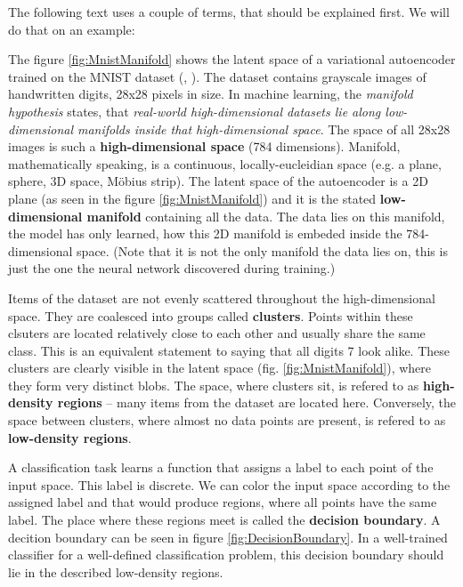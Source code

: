 \qquad

The following text uses a couple of terms, that should be explained first. We will do that on an example:

The figure \ref{fig:MnistManifold} shows the latent space of a variational autoencoder trained on the MNIST dataset (\cite{VariationalAutoencoder}, \cite{Mnist}). The dataset contains grayscale images of handwritten digits, 28x28 pixels in size. In machine learning, the \emph{manifold hypothesis} states, that \emph{real-world high-dimensional datasets lie along low-dimensional manifolds inside that high-dimensional space}. The space of all 28x28 images is such a \textbf{high-dimensional space} (784 dimensions). Manifold, mathematically speaking, is a continuous, locally-eucleidian space (e.g. a plane, sphere, 3D space, Möbius strip). The latent space of the autoencoder is a 2D plane (as seen in the figure \ref{fig:MnistManifold}) and it is the stated \textbf{low-dimensional manifold} containing all the data. The data lies on this manifold, the model has only learned, how this 2D manifold is embeded inside the 784-dimensional space. (Note that it is not the only manifold the data lies on, this is just the one the neural network discovered during training.)

Items of the dataset are not evenly scattered throughout the high-dimensional space. They are coalesced into groups called \textbf{clusters}. Points within these clsuters are located relatively close to each other and usually share the same class. This is an equivalent statement to saying that all digits 7 look alike. These clusters are clearly visible in the latent space (fig. \ref{fig:MnistManifold}), where they form very distinct blobs. The space, where clusters sit, is refered to as \textbf{high-density regions} -- many items from the dataset are located here. Conversely, the space between clusters, where almost no data points are present, is refered to as \textbf{low-density regions}.

A classification task learns a function that assigns a label to each point of the input space. This label is discrete. We can color the input space according to the assigned label and that would produce regions, where all points have the same label. The place where these regions meet is called the \textbf{decision boundary}. A decition boundary can be seen in figure \ref{fig:DecisionBoundary}. In a well-trained classifier for a well-defined classification problem, this decision boundary should lie in the described low-density regions.


